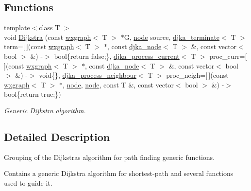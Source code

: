 \subsection*{Functions}
\begin{DoxyCompactItemize}
\item 
{\footnotesize template$<$class T $>$ }\\void \hyperlink{namespacelgraph_1_1traversal_1_1dijkstra_a841778a8e888fb90b5a39d54e5d776eb}{Dijkstra} (const \hyperlink{classlgraph_1_1utils_1_1wxgraph}{wxgraph}$<$ T $>$ $\ast$G, \hyperlink{namespacelgraph_1_1utils_a7bd66ede3805ef121bc2835bd48de0cf}{node} source, \hyperlink{namespacelgraph_1_1traversal_1_1dijkstra_a275e9ff05e4d3199245b9642cc88fc74}{djka\+\_\+terminate}$<$ T $>$ term=\mbox{[}$\,$\mbox{]}(const \hyperlink{classlgraph_1_1utils_1_1wxgraph}{wxgraph}$<$ T $>$ $\ast$, const \hyperlink{namespacelgraph_1_1traversal_1_1dijkstra_a06495bda19735564a02a6e98198a0980}{djka\+\_\+node}$<$ T $>$ \&, const vector$<$ bool $>$ \&) -\/$>$ bool\{return false;\}, \hyperlink{namespacelgraph_1_1traversal_1_1dijkstra_a1b15b8b987d2eea35dd01676ba1d3b35}{djka\+\_\+process\+\_\+current}$<$ T $>$ proc\+\_\+curr=\mbox{[}$\,$\mbox{]}(const \hyperlink{classlgraph_1_1utils_1_1wxgraph}{wxgraph}$<$ T $>$ $\ast$, const \hyperlink{namespacelgraph_1_1traversal_1_1dijkstra_a06495bda19735564a02a6e98198a0980}{djka\+\_\+node}$<$ T $>$ \&, const vector$<$ bool $>$ \&) -\/$>$ void\{\}, \hyperlink{namespacelgraph_1_1traversal_1_1dijkstra_abd266610f7bab0d52a202238ca539d38}{djka\+\_\+process\+\_\+neighbour}$<$ T $>$ proc\+\_\+neigh=\mbox{[}$\,$\mbox{]}(const \hyperlink{classlgraph_1_1utils_1_1wxgraph}{wxgraph}$<$ T $>$ $\ast$, \hyperlink{namespacelgraph_1_1utils_a7bd66ede3805ef121bc2835bd48de0cf}{node}, \hyperlink{namespacelgraph_1_1utils_a7bd66ede3805ef121bc2835bd48de0cf}{node}, const T \&, const vector$<$ bool $>$ \&) -\/$>$ bool\{return true;\})
\begin{DoxyCompactList}\small\item\em Generic Dijkstra algorithm. \end{DoxyCompactList}\end{DoxyCompactItemize}


\subsection{Detailed Description}
Grouping of the Dijkstra\textquotesingle{}s algorithm for path finding generic functions. 

Contains a generic Dijkstra algorithm for shortest-\/path and several functions used to guide it. 

